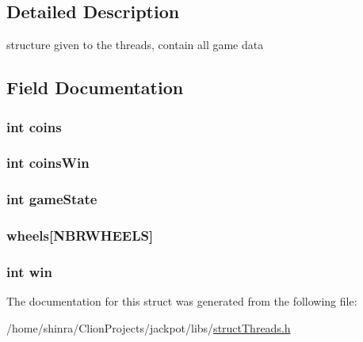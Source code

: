 \subsection{Detailed Description}
structure given to the threads, contain all game data 

\subsection{Field Documentation}
\hypertarget{structcontroller__t_ad7b19ae27c8e920ec00b72fb993ebd1e}{
\subsubsection[{coins}]{\setlength{\rightskip}{0pt plus 5cm}int coins}}\label{structcontroller__t_ad7b19ae27c8e920ec00b72fb993ebd1e}
\hypertarget{structcontroller__t_a3642e8c2aae062cde03de850a554d930}{
\subsubsection[{coins\+Win}]{\setlength{\rightskip}{0pt plus 5cm}int coins\+Win}}\label{structcontroller__t_a3642e8c2aae062cde03de850a554d930}
\hypertarget{structcontroller__t_ab7ad0796d84021de0fd46246b3d5096f}{
\subsubsection[{game\+State}]{\setlength{\rightskip}{0pt plus 5cm}int game\+State}}\label{structcontroller__t_ab7ad0796d84021de0fd46246b3d5096f}
\hypertarget{structcontroller__t_a3f7af3fa67cf8e8bfba5ce83ca482139}{
\subsubsection[{wheels}]{ wheels\mbox{[}{\bf N\+B\+R\+W\+H\+E\+E\+L\+S}\mbox{]}}}\label{structcontroller__t_a3f7af3fa67cf8e8bfba5ce83ca482139}
\hypertarget{structcontroller__t_a7fee7b546595edcbee920757b6309386}{
\subsubsection[{win}]{\setlength{\rightskip}{0pt plus 5cm}int win}}\label{structcontroller__t_a7fee7b546595edcbee920757b6309386}


The documentation for this struct was generated from the following file\+:\begin{DoxyCompactItemize}
\item 
/home/shinra/\+Clion\+Projects/jackpot/libs/\hyperlink{struct_threads_8h}{struct\+Threads.\+h}\end{DoxyCompactItemize}
